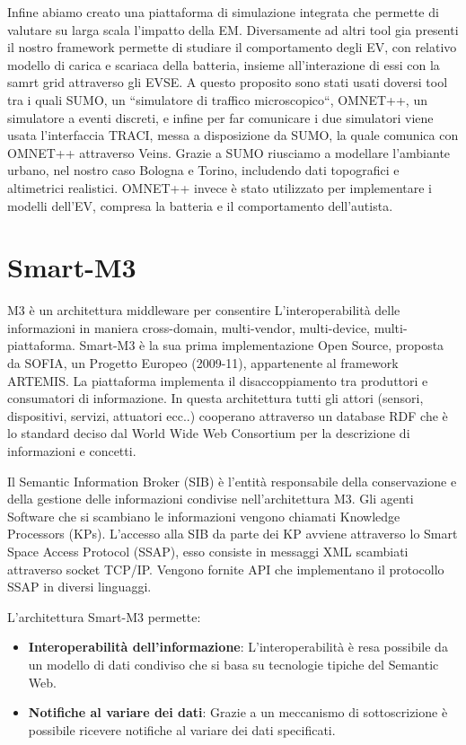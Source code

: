 Infine abiamo creato una piattaforma di simulazione integrata che permette di valutare su larga scala
l'impatto della EM. Diversamente ad altri tool gia presenti il nostro framework permette di studiare 
il comportamento degli EV, con relativo modello di carica e scariaca della batteria, insieme all'interazione
di essi con la samrt grid attraverso gli EVSE. A questo proposito sono stati usati doversi tool tra i quali
SUMO, un ``simulatore di traffico microscopico``, OMNET++, un simulatore a eventi discreti, e infine per 
far comunicare i due simulatori viene usata l'interfaccia TRACI, messa a disposizione da SUMO, la quale
comunica con OMNET++ attraverso Veins. Grazie a SUMO riusciamo a modellare l'ambiante urbano, nel nostro 
caso Bologna e Torino, includendo dati topografici e altimetrici realistici. OMNET++ invece è stato
utilizzato per implementare i modelli dell'EV, compresa la batteria e il comportamento dell'autista.

\section{Smart-M3}

M3 è un architettura middleware per consentire L'interoperabilità delle informazioni in maniera cross-domain, multi-vendor, multi-device, multi-piattaforma. Smart-M3 è la sua prima implementazione Open Source, proposta da SOFIA, un Progetto Europeo (2009-11), appartenente al framework ARTEMIS. 
La piattaforma implementa il disaccoppiamento tra produttori e consumatori di informazione. In questa architettura tutti gli attori (sensori, dispositivi, servizi, attuatori ecc..) cooperano attraverso un database RDF che è lo standard deciso dal World Wide Web Consortium per la descrizione di informazioni e concetti.

Il Semantic Information Broker (SIB) è l'entità responsabile della conservazione e della gestione delle informazioni condivise nell'architettura M3. Gli agenti Software che si scambiano le informazioni vengono chiamati Knowledge Processors (KPs). L'accesso alla SIB da parte dei KP avviene attraverso lo Smart Space Access Protocol  (SSAP), esso consiste in messaggi XML scambiati attraverso socket TCP/IP. Vengono fornite API che implementano il protocollo SSAP in diversi linguaggi.

L'architettura Smart-M3 permette:

\begin{itemize}
	\item \textbf{Interoperabilità dell'informazione}: L'interoperabilità è resa possibile da un modello di dati condiviso che si basa su tecnologie tipiche del Semantic Web.
	\item \textbf{Notifiche al variare dei dati}: Grazie a un meccanismo di sottoscrizione è possibile ricevere notifiche al variare dei dati specificati.
\end{itemize}

